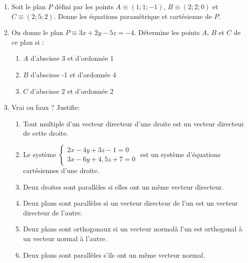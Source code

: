 \begin{enumerate}
		\item Soit le plan $P$ défini par les points $A \equiv \left(1; 1; -1\right)$, $B \equiv \left(2; 2; 0\right)$ et $C \equiv \left(2; 5; 2\right)$. Donne les équations paramétrique et cartésienne de $P$.
		
		\item On donne le plan $P \equiv 3x + 2y - 5z = -4$. Détermine les points $A$, $B$ et $C$ de ce plan si :
			\begin{enumerate}
				\item $A$ d'abscisse 3 et d'ordonnée 1
				\item $B$ d'abscisse -1 et d'ordonnée 4
				\item $C$ d'abscisse 2 et d'ordonnée 2
			\end{enumerate}
		
		\item Vrai ou faux ? Justifie:
			\begin{enumerate}
				\item Tout multiple d'un vecteur directeur d'une droite est un vecteur directeur de cette droite.
				\item Le système $\begin{cases}
					2x - 4y + 3z - 1 = 0\\
					3x - 6y + 4,5z +7 = 0
				\end{cases}$ est un système d'équations cartésiennes d'une droite.
				\item Deux droites sont parallèles si elles ont un même vecteur directeur.
				\item Deux plans sont parallèles si un vecteur directeur de l'un est un vecteur directeur de l'autre.
				\item Deux plans sont orthogonaux si un vecteur normalà l'un est orthogonal à un vecteur normal à l'autre.
				\item Deux plans sont parallèles s'ils ont un même vecteur normal.
			\end{enumerate}
	
	\end{enumerate}
	
